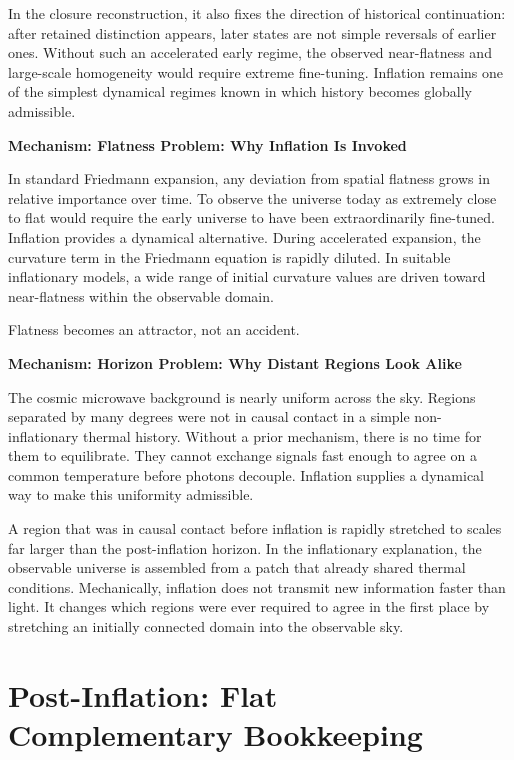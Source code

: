 \documentclass[11pt,twoside,openright]{book}
\newenvironment{mechanismbox}[1]
  {\begin{framed}\noindent\textbf{Mechanism: #1}\par\medskip}
  {\end{framed}}
\begin{document}
In the closure reconstruction, it also fixes the direction of historical continuation: after retained distinction appears, later states are not simple reversals of earlier ones. Without such an accelerated early regime, the observed near-flatness and large-scale homogeneity would require extreme fine-tuning. Inflation remains one of the simplest dynamical regimes known in which history becomes globally admissible.

\begin{mechanismbox}{Flatness Problem: Why Inflation Is Invoked}

In standard Friedmann expansion, any deviation from spatial flatness grows in relative importance over time. To observe the universe today as extremely close to flat would require the early universe to have been extraordinarily fine-tuned. Inflation provides a dynamical alternative. During accelerated expansion, the curvature term in the Friedmann equation is rapidly diluted. In suitable inflationary models, a wide range of initial curvature values are driven toward near-flatness within the observable domain.

Flatness becomes an attractor, not an accident.

\end{mechanismbox}

\begin{mechanismbox}{Horizon Problem: Why Distant Regions Look Alike}

The cosmic microwave background is nearly uniform across the sky. Regions separated by many degrees were not in causal contact in a simple non-inflationary thermal history. Without a prior mechanism, there is no time for them to equilibrate. They cannot exchange signals fast enough to agree on a common temperature before photons decouple. Inflation supplies a dynamical way to make this uniformity admissible.

A region that was in causal contact before inflation is rapidly stretched to scales far larger than the post-inflation horizon. In the inflationary explanation, the observable universe is assembled from a patch that already shared thermal conditions. Mechanically, inflation does not transmit new information faster than light. It changes which regions were ever required to agree in the first place by stretching an initially connected domain into the observable sky.

\end{mechanismbox}
\chapter{Post-Inflation: Flat Complementary Bookkeeping}
\end{document}
